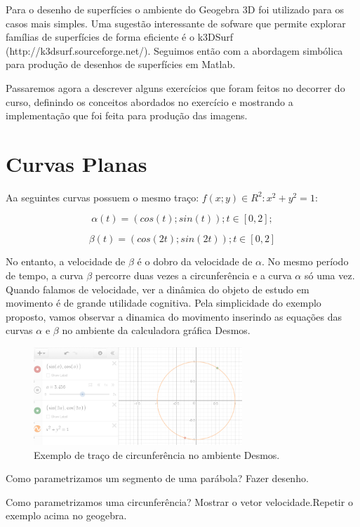\documentclass[a4paper]{article}
\begin{document}
Para o desenho de superfícies o ambiente do Geogebra 3D foi utilizado para os casos mais simples. Uma sugestão interessante de sofware que permite explorar famílias de superfícies de forma eficiente é o k3DSurf (http://k3dsurf.sourceforge.net/). Seguimos então com a abordagem simbólica para produção de desenhos de superfícies em Matlab. 

Passaremos agora a descrever alguns exercícios que foram feitos no decorrer do curso, definindo os conceitos abordados no exercício e mostrando a implementação que foi feita para produção das imagens. 

\section{Curvas Planas}

Aa seguintes curvas possuem o mesmo traço: ${f(x; y) \in R^2 : x^2 + y^2 = 1}$:

\[\alpha(t) = (cos(t); sin(t)); t \in [0, 2];\]

\[\beta(t) = (cos(2t); sin(2t)); t \in [0, 2]\]

No entanto, a velocidade de $\beta$ é o dobro da velocidade de $\alpha$. 
No mesmo período de tempo, a curva $\beta$ percorre duas vezes a circunferência e a curva $\alpha$ só uma vez.
Quando falamos de velocidade, ver a dinâmica do objeto de estudo em movimento é de grande utilidade cognitiva. Pela simplicidade do exemplo proposto, vamos observar a dinamica do movimento inserindo as equações das curvas $\alpha$ e $\beta$ no ambiente da calculadora gráfica Desmos.

\begin{figure}[ht]
\centering
\includegraphics[width=0.7\textwidth]{desmos_circ.png}
\caption{\label{fig:desmos_circ} Exemplo de traço de circunferência no ambiente Desmos.}
\end{figure}

Como parametrizamos um segmento de uma parábola? Fazer desenho.

Como parametrizamos uma circunferência? Mostrar o vetor velocidade.Repetir o exemplo acima no geogebra.
\end{document}
